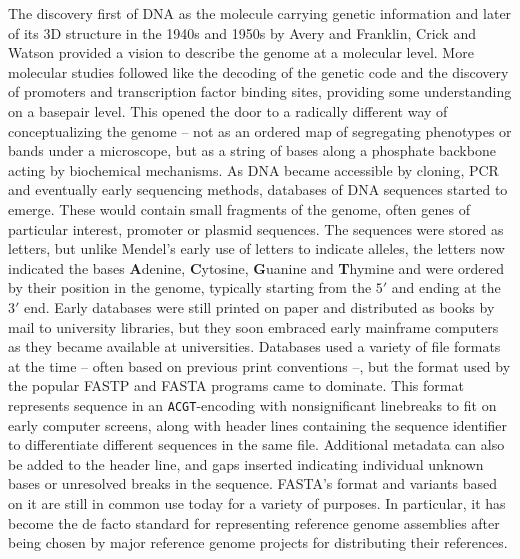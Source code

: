 The discovery first of DNA as the molecule carrying genetic information and later of its 3D structure in the 1940s and 1950s by Avery\cite{avery42} and Franklin, Crick and Watson\cite{watson53} provided a vision to describe the genome at a molecular level.
More molecular studies followed like the decoding of the genetic code and the discovery of promoters and transcription factor binding sites, providing some understanding on a basepair level\cite{nirenberg61, roeder19}.
This opened the door to a radically different way of conceptualizing the genome -- not as an ordered map of segregating phenotypes or bands under a microscope, but as a string of bases along a phosphate backbone acting by biochemical mechanisms.
As DNA became accessible by cloning, PCR and eventually early sequencing methods, databases of DNA sequences started to emerge.
These would contain small fragments of the genome, often genes of particular interest, promoter or plasmid sequences.
The sequences were stored as letters, but unlike Mendel's early use of letters to indicate alleles, the letters now indicated the bases \textbf{A}denine, \textbf{C}ytosine, \textbf{G}uanine and \textbf{T}hymine and were ordered by their position in the genome, typically starting from the $5'$ and ending at the $3'$ end. 
Early databases were still printed on paper and distributed as books by mail to university libraries, but they soon embraced early mainframe computers as they became available at universities.
Databases used a variety of file formats at the time -- often based on previous print conventions --, but the format used by the popular FASTP and FASTA programs came to dominate\cite{lipman85, pearson88}. %
This format represents sequence in an \texttt{ACGT}-encoding with nonsignificant linebreaks to fit on early computer screens, along with header lines containing the sequence identifier to differentiate different sequences in the same file. 
Additional metadata can also be added to the header line, and gaps inserted indicating individual unknown bases or unresolved breaks in the sequence. %
FASTA's format and variants based on it are still in common use today for a variety of purposes. 
In particular, it has become the de facto standard for representing reference genome assemblies after being chosen by major reference genome projects for distributing their references. %

